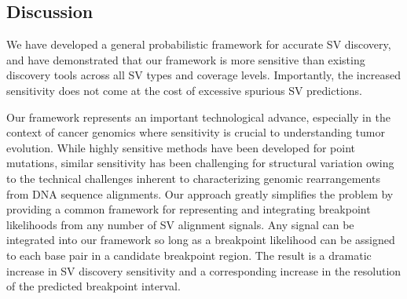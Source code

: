 \documentclass[10pt]{bmc_article}
\newenvironment{bmcformat}{\begin{raggedright}\baselineskip20pt\sloppy\setboolean{publ}{false}}{\end{raggedright}\baselineskip20pt\sloppy}
\begin{document}
\begin{bmcformat}
\section*{Discussion}
We have developed a general probabilistic framework for accurate SV discovery,
and have demonstrated that our framework is more sensitive than existing
discovery tools across all SV types and coverage levels. Importantly, the
increased sensitivity does not come at the cost of excessive spurious SV
predictions.

Our framework represents an important technological advance, especially in the
context of cancer genomics where sensitivity is crucial to understanding tumor
evolution. While highly sensitive methods have been developed for point
mutations, similar sensitivity has been challenging for structural variation
owing to the technical challenges inherent to characterizing genomic
rearrangements from DNA sequence alignments. Our approach greatly simplifies the
problem by providing a common framework for representing and integrating
breakpoint likelihoods from any number of SV alignment signals. Any signal can
be integrated into our framework so long as a breakpoint likelihood can be
assigned to each base pair in a candidate breakpoint region. The result is a
dramatic increase in SV discovery sensitivity and a corresponding increase in
the resolution of the predicted breakpoint interval.



\end{bmcformat}
\end{document}
